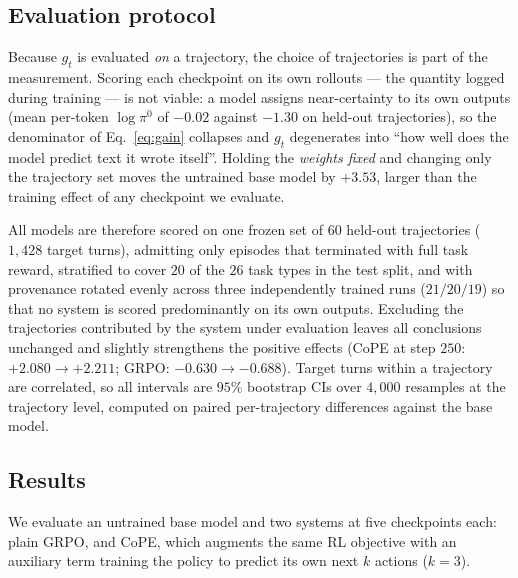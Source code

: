 \subsection{Evaluation protocol}
\label{sec:te-protocol}

Because $g_t$ is evaluated \emph{on} a trajectory, the choice of trajectories is part
of the measurement. Scoring each checkpoint on its own rollouts --- the quantity
logged during training --- is not viable: a model assigns near-certainty to its own
outputs (mean per-token $\log \pi^{0}$ of $-0.02$ against $-1.30$ on held-out
trajectories), so the denominator of Eq.~\eqref{eq:gain} collapses and $g_t$
degenerates into ``how well does the model predict text it wrote itself''. Holding
the \emph{weights fixed} and changing only the trajectory set moves the untrained base
model by $+3.53$, larger than the training effect of any checkpoint we evaluate.

All models are therefore scored on one frozen set of $60$ held-out trajectories
($1{,}428$ target turns), admitting only episodes that terminated with full task
reward, stratified to cover $20$ of the $26$ task types in the test split, and with
provenance rotated evenly across three independently trained runs ($21/20/19$) so that
no system is scored predominantly on its own outputs. Excluding the trajectories
contributed by the system under evaluation leaves all conclusions unchanged and
slightly strengthens the positive effects (CoPE at step $250$:
$+2.080 \rightarrow +2.211$; GRPO: $-0.630 \rightarrow -0.688$). Target turns within a
trajectory are correlated, so all intervals are $95\%$ bootstrap CIs over $4{,}000$
resamples at the trajectory level, computed on paired per-trajectory differences
against the base model.

\subsection{Results}
\label{sec:te-findings}

We evaluate an untrained base model and two systems at five checkpoints each: plain
GRPO, and CoPE, which augments the same RL objective with an auxiliary term training
the policy to predict its own next $k$ actions ($k=3$).

